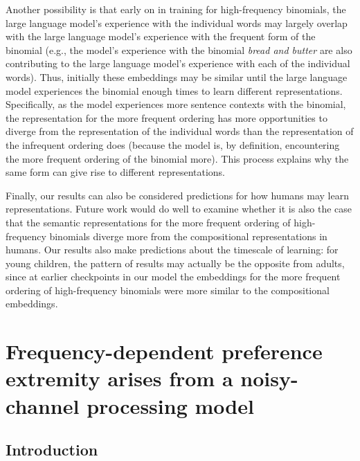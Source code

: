 \documentclass[
  12pt,
  letterpaper,
]{scrreport}
\begin{document}
Another possibility is that early on in training for high-frequency
binomials, the large language model's experience with the individual
words may largely overlap with the large language model's experience
with the frequent form of the binomial (e.g., the model's experience
with the binomial \emph{bread and butter} are also contributing to the
large language model's experience with each of the individual words).
Thus, initially these embeddings may be similar until the large language
model experiences the binomial enough times to learn different
representations. Specifically, as the model experiences more sentence
contexts with the binomial, the representation for the more frequent
ordering has more opportunities to diverge from the representation of
the individual words than the representation of the infrequent ordering
does (because the model is, by definition, encountering the more
frequent ordering of the binomial more). This process explains why the
same form can give rise to different representations.

Finally, our results can also be considered predictions for how humans
may learn representations. Future work would do well to examine whether
it is also the case that the semantic representations for the more
frequent ordering of high-frequency binomials diverge more from the
compositional representations in humans. Our results also make
predictions about the timescale of learning: for young children, the
pattern of results may actually be the opposite from adults, since at
earlier checkpoints in our model the embeddings for the more frequent
ordering of high-frequency binomials were more similar to the
compositional embeddings.


\chapter{Frequency-dependent preference extremity arises from a
noisy-channel processing
model}\label{frequency-dependent-preference-extremity-arises-from-a-noisy-channel-processing-model}

\section{Introduction}\label{introduction-5}
\end{document}
